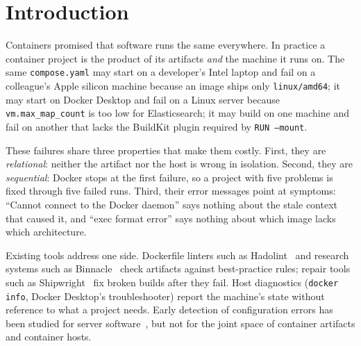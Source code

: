 \documentclass[preprint,12pt]{elsarticle}
\begin{document}
\section{Introduction}
\label{sec:intro}

Containers promised that software runs the same everywhere. In practice a container project is the product of its artifacts \emph{and} the machine it runs on. The same \texttt{compose.yaml} may start on a developer's Intel laptop and fail on a colleague's Apple silicon machine because an image ships only \texttt{linux/amd64}; it may start on Docker Desktop and fail on a Linux server because \texttt{vm.max\_map\_count} is too low for Elasticsearch; it may build on one machine and fail on another that lacks the BuildKit plugin required by \texttt{RUN --mount}.

These failures share three properties that make them costly. First, they are \emph{relational}: neither the artifact nor the host is wrong in isolation. Second, they are \emph{sequential}: Docker stops at the first failure, so a project with five problems is fixed through five failed runs. Third, their error messages point at symptoms: ``Cannot connect to the Docker daemon'' says nothing about the stale context that caused it, and ``exec format error'' says nothing about which image lacks which architecture.

Existing tools address one side. Dockerfile linters such as Hadolint~\cite{hadolint} and research systems such as Binnacle~\cite{henkel2020binnacle} check artifacts against best-practice rules; repair tools such as Shipwright~\cite{henkel2021shipwright} fix broken builds after they fail. Host diagnostics (\texttt{docker info}, Docker Desktop's troubleshooter) report the machine's state without reference to what a project needs. Early detection of configuration errors has been studied for server software~\cite{xu2016pcheck}, but not for the joint space of container artifacts and container hosts.
\end{document}
